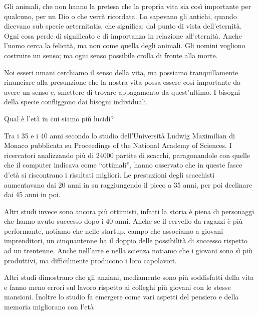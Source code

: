 \documentclass[12pt]{book} %
\begin{document}
Gli animali, che non hanno la pretesa che la propria vita sia così importante per qualcuno, per un Dio o che verrà
ricordata. Lo sapevano gli
antichi, quando dicevano sub specie aeternitatis, che significa: dal punto di vista dell'eternità. Ogni cosa perde di
significato e di importanza in relazione all'eternità. Anche l'uomo cerca la felicità, ma non come quella degli
animali. Gli uomini vogliono costruire un senso; ma ogni senso possibile crolla di fronte alla morte.

Noi esseri umani cerchiamo il senso della vita, ma possiamo tranquillamente rinunciare alla presunzione che la nostra
vita possa essere così importante da avere un senso e, smettere di trovare appagamento da
quest'ultimo. I bisogni della specie confliggono dai bisogni individuali.

\begin{mdframed}[linewidth=1pt]
Qual è l'età in cui siamo più lucidi?

Tra i 35 e i 40 anni secondo lo studio dell'Università Ludwig Maximilian di Monaco pubblicata su Proceedings of the
National Academy of Sciences. I ricercatori analizzando più di 24000 partite di scacchi, paragonandole con quelle che
il computer indicava come “ottimali”, hanno osservato che in queste fasce d'età si riscontrano i
risultati migliori. Le prestazioni degli scacchisti aumentavano dai 20 anni in su raggiungendo il picco a 35 anni, per
poi declinare dai 45 anni in poi. 

Altri studi invece sono ancora più ottimisti, infatti la storia è piena di personaggi che hanno avuto successo dopo i 40
anni. Anche se il cervello da ragazzi è più performante, notiamo che nelle startup, campo che associamo a giovani
imprenditori, un cinquantenne ha il doppio delle possibilità di successo rispetto ad un trentenne. Anche nell'arte e
nella scienza notiamo che i giovani sono sì più produttivi, ma difficilmente producono i loro capolavori.

Altri studi dimostrano che gli anziani, mediamente sono più soddisfatti della vita e fanno meno errori sul lavoro
rispetto ai colleghi più giovani con le stesse mansioni. Inoltre lo studio fa emergere come vari aspetti del pensiero e
della memoria migliorano con l'età



\end{mdframed}
\end{document}
